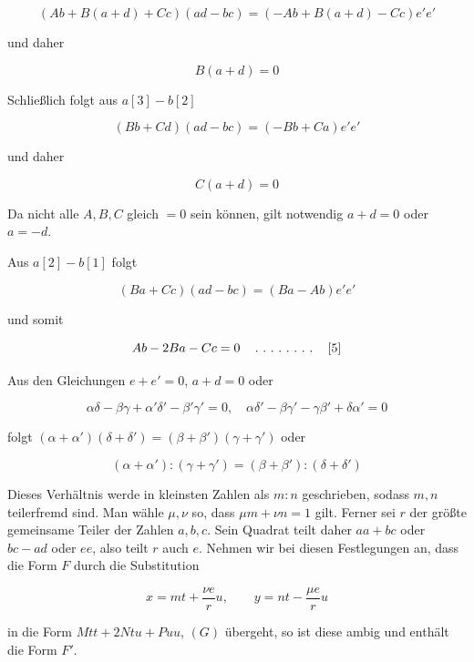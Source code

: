 
\[
(Ab+B(a+d)+Cc)(ad-bc)=(-Ab+B(a+d)-Cc)e'e'
\]

und daher

\[
B(a+d)=0
\]

Schließlich folgt aus $a[3]-b[2]$

\[
(Bb+Cd)(ad-bc)=(-Bb+Ca)e'e'
\]

und daher

\[
C(a+d)=0
\]

Da nicht alle $A,B,C$ gleich $=0$ sein können, gilt notwendig $a+d=0$ oder $a=-d$.

Aus $a[2]-b[1]$ folgt

\[
(Ba+Cc)(ad-bc)=(Ba-Ab)e'e'
\]

und somit

\[
Ab-2Ba-Cc=0\quad\mathinner{.\ .\ .\ .\ .\ .\ .\ .}\quad[5]
\]

Aus den Gleichungen $e+e'=0$, $a+d=0$ oder

\[
\alpha\delta-\beta\gamma+\alpha'\delta'-\beta'\gamma'=0,\quad\alpha\delta'-\beta\gamma'-\gamma\beta'+\delta\alpha'=0
\]

folgt $(\alpha+\alpha')(\delta+\delta')=(\beta+\beta')(\gamma+\gamma')$ oder

\[
(\alpha+\alpha'):(\gamma+\gamma')=(\beta+\beta'):(\delta+\delta')
\]

Dieses Verhältnis werde in kleinsten Zahlen als $m:n$ geschrieben, sodass $m,n$ teilerfremd sind. Man wähle $\mu,\nu$ so, dass $\mu m+\nu n=1$ gilt. Ferner sei $r$ der größte gemeinsame Teiler der Zahlen $a,b,c$. Sein Quadrat teilt daher $aa+bc$ oder $bc-ad$ oder $ee$, also teilt $r$ auch $e$. Nehmen wir bei diesen Festlegungen an, dass die Form $F$ durch die Substitution

\[
x=mt+\frac{\nu e}{r}u,\qquad y=nt-\frac{\mu e}{r}u
\]

in die Form $Mtt+2Ntu+Puu$, $(G)$ übergeht, so ist diese ambig und enthält die Form $F'$.


